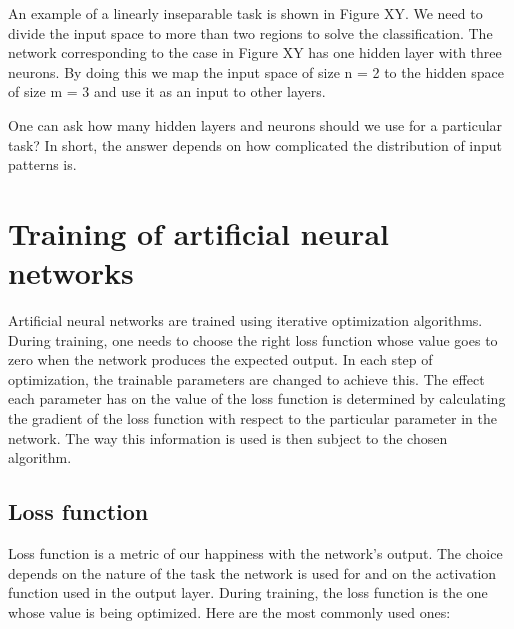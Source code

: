 An example of a linearly inseparable task is shown in Figure XY. We need to divide the input space to more than two regions to solve the classification. The network corresponding to the case in Figure XY has one hidden layer with three neurons. By doing this we map the input space of size n = 2 to the hidden space of size m = 3 and use it as an input to other layers.

One can ask how many hidden layers and neurons should we use for a particular task? In short, the answer depends on how complicated the distribution of input patterns is.








\section{Training of artificial neural networks}

Artificial neural networks are trained using iterative optimization algorithms. During training, one needs to choose the right loss function whose value goes to zero when the network produces the expected output. In each step of optimization, the trainable parameters are changed to achieve this. The effect each parameter has on the value of the loss function is determined by calculating the gradient of the loss function with respect to the particular parameter in the network. The way this information is used is then subject to the chosen algorithm. 

\subsection{Loss function}

Loss function is a metric of our happiness with the network's output. The choice depends on the nature of the task the network is used for and on the activation function used in the output layer. During training, the loss function is the one whose value is being optimized. Here are the most commonly used ones:

